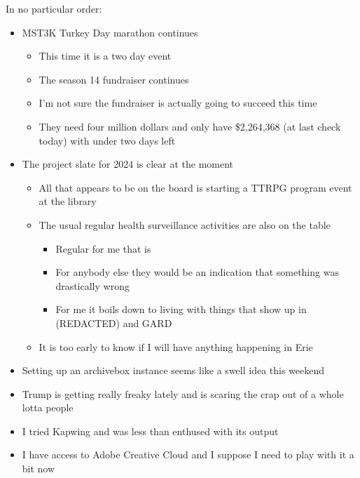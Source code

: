 In no particular order:

\begin{itemize}
\tightlist
\item
  MST3K Turkey Day marathon continues

  \begin{itemize}
  \tightlist
  \item
    This time it is a two day event
  \item
    The season 14 fundraiser continues
  \item
    I'm not sure the fundraiser is actually going to succeed this time
  \item
    They need four million dollars and only have \$2,264,368 (at last
    check today) with under two days left
  \end{itemize}
\item
  The project slate for 2024 is clear at the moment

  \begin{itemize}
  \tightlist
  \item
    All that appears to be on the board is starting a TTRPG program
    event at the library
  \item
    The usual regular health surveillance activities are also on the
    table

    \begin{itemize}
    \tightlist
    \item
      Regular for me that is
    \item
      For anybody else they would be an indication that something was
      drastically wrong
    \item
      For me it boils down to living with things that show up in
      (REDACTED) and GARD
    \end{itemize}
  \item
    It is too early to know if I will have anything happening in Erie
  \end{itemize}
\item
  Setting up an archivebox instance seems like a swell idea this weekend
\item
  Trump is getting really freaky lately and is scaring the crap out of a
  whole lotta people
\item
  I tried Kapwing and was less than enthused with its output
\item
  I have access to Adobe Creative Cloud and I suppose I need to play
  with it a bit now
\end{itemize}

